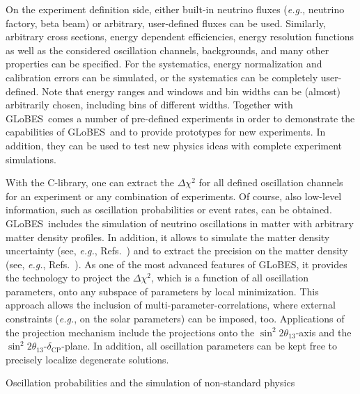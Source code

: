 \documentclass[12pt,a4paper]{article}
\makeatletter
\renewcommand{\section}{\@startsection{section}{1}{0em}{-\baselineskip}%
{\baselineskip}{\normalfont\large\bfseries}}
\newcommand{\eg}{{\it e.g.}}
\newcommand{\Refs}{Refs.}
\newcommand{\deltacp}{\delta_{\mathrm{CP}}}
\newcommand{\stheta}{\sin^2 2 \theta_{13}}
\newcommand{\GLOBES}{{\sf GLoBES}}
\makeatother
\begin{document}
On the experiment definition side, either built-in neutrino fluxes
(\eg, neutrino factory, beta beam) or arbitrary, user-defined fluxes can be used. 
Similarly,
arbitrary cross sections, energy dependent efficiencies,
energy resolution functions as well as the considered oscillation channels, 
backgrounds, and many other properties can be specified. 
For the systematics, energy
normalization and calibration errors can be simulated, or the
systematics can be completely user-defined. Note that
energy ranges and windows and bin widths can be
(almost) arbitrarily chosen, including bins of different
widths. Together with \GLOBES\ comes a number of
pre-defined experiments in order to demonstrate the capabilities
of \GLOBES\ and to provide prototypes for new experiments.
In addition, they can be used to test new physics ideas with
complete experiment simulations.

With the C-library, one can extract the $\Delta \chi^2$ for all defined 
oscillation channels for an experiment or any combination of experiments.
Of course, also low-level information, such as oscillation
probabilities or event rates, can be obtained. \GLOBES\ includes the
simulation of neutrino oscillations in matter with arbitrary matter 
density profiles. In addition, it allows to simulate the matter density
uncertainty (see, \eg, \Refs~\cite{Huber:2002mx,Ohlsson:2003ip}) and to 
extract the precision on the matter density (see, \eg, \Refs~\cite{Winter:2005we,Gandhi:2006gu}).
 As one of the most
advanced features of \GLOBES , it provides the technology to 
project the $\Delta \chi^2$, which is a function of all oscillation
parameters, onto any subspace of parameters by local minimization. 
This approach allows the inclusion of multi-parameter-correlations,
where external constraints (\eg, on the solar parameters) can be imposed, too.
Applications of the projection mechanism include the projections onto 
the $\stheta$-axis and the $\stheta$-$\deltacp$-plane. In addition, 
all oscillation parameters can be kept free to precisely localize 
degenerate solutions.

\section{Oscillation probabilities and the simulation of non-standard physics}
\end{document}
